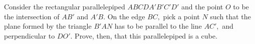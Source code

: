 Consider the rectangular parallelepiped $ ABCDA'B'C'D' $ and the point $ O $ to be the intersection of $ AB' $ and $ A'B. $ On the edge $ BC, $ pick a point $ N $ such that the plane formed by the triangle $ B'AN $ has to be parallel to the line $ AC', $ and perpendicular to $ DO'. $
Prove, then, that this parallelepiped is a cube.